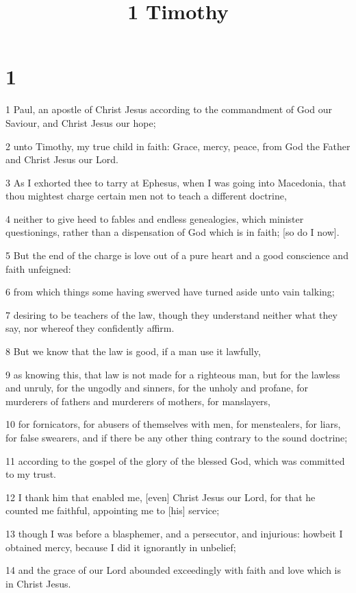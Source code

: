 

\title{1 Timothy}

\chapter{1}

\par 1 Paul, an apostle of Christ Jesus according to the commandment of God our Saviour, and Christ Jesus our hope;
\par 2 unto Timothy, my true child in faith: Grace, mercy, peace, from God the Father and Christ Jesus our Lord.
\par 3 As I exhorted thee to tarry at Ephesus, when I was going into Macedonia, that thou mightest charge certain men not to teach a different doctrine,
\par 4 neither to give heed to fables and endless genealogies, which minister questionings, rather than a dispensation of God which is in faith; [so do I now].
\par 5 But the end of the charge is love out of a pure heart and a good conscience and faith unfeigned:
\par 6 from which things some having swerved have turned aside unto vain talking;
\par 7 desiring to be teachers of the law, though they understand neither what they say, nor whereof they confidently affirm.
\par 8 But we know that the law is good, if a man use it lawfully,
\par 9 as knowing this, that law is not made for a righteous man, but for the lawless and unruly, for the ungodly and sinners, for the unholy and profane, for murderers of fathers and murderers of mothers, for manslayers,
\par 10 for fornicators, for abusers of themselves with men, for menstealers, for liars, for false swearers, and if there be any other thing contrary to the sound doctrine;
\par 11 according to the gospel of the glory of the blessed God, which was committed to my trust.
\par 12 I thank him that enabled me, [even] Christ Jesus our Lord, for that he counted me faithful, appointing me to [his] service;
\par 13 though I was before a blasphemer, and a persecutor, and injurious: howbeit I obtained mercy, because I did it ignorantly in unbelief;
\par 14 and the grace of our Lord abounded exceedingly with faith and love which is in Christ Jesus.
